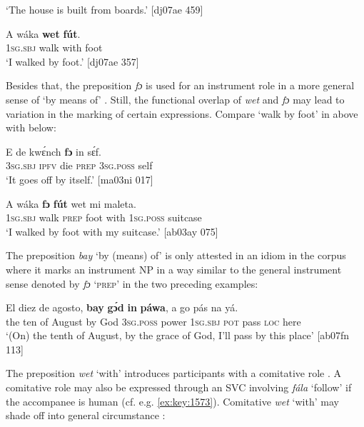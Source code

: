 \glt ‘The house is built from boards.’ [dj07ae 459]
\z


\ea%
    \label{ex:key:1067}
    \gll A    wáka  \textbf{wet}    \textbf{fút}.\\
\textsc{1sg.sbj}  walk  with    foot\\

\glt ‘I walked by foot.’ [dj07ae 357]
\z

Besides that, the preposition \textit{fɔ} is used for an instrument role in a more general sense of ‘by means of’ . Still, the functional overlap of \textit{wet} and \textit{fɔ} may lead to variation in the marking of certain expressions. Compare ‘walk by foot’ in  above with  below: 


\ea%
    \label{ex:key:1068}
    \gll E    de  kwɛ́nch  \textbf{fɔ}  in    sɛ́f.\\
\textsc{3sg.sbj}  \textsc{ipfv}  die    \textsc{prep}  \textsc{3sg.poss}  self\\

\glt ‘It goes off by itself.’ [ma03ni 017]
\z


\ea%
    \label{ex:key:1069}
    \gll A    wáka  \textbf{fɔ}  \textbf{fút}  wet    mi    maleta.\\
\textsc{1sg.sbj}  walk  \textsc{prep}  foot  with    \textsc{1sg.poss}  suitcase\\

\glt ‘I walked by foot with my suitcase.’ [ab03ay 075]
\z

The preposition \textit{bay} ‘by (means) of’ is only attested in an idiom in the corpus where it marks an instrument NP in a way similar to the general instrument sense denoted by \textit{fɔ} ‘\textsc{prep}’ in the two preceding examples:


\ea%
    \label{ex:key:1070}
    \gll El  diez  de  agosto,  \textbf{bay}  \textbf{gɔ́d}  \textbf{in}    \textbf{páwa},  a    go  pás  na  yá.\\
the  ten  of  August  by  God  \textsc{3sg.poss}  power  \textsc{1sg.sbj}  \textsc{pot}  pass  \textsc{loc}  here\\

\glt ‘(On) the tenth of August, by the grace of God, I’ll pass by this place’ [ab07fn 113]
\z

The preposition \textit{wet} ‘with’ introduces participants with a comitative role . A comitative role may also be expressed through an SVC involving \textit{fála} ‘follow’ if the accompanee is human (cf. e.g. \ref{ex:key:1573}). Comitative \textit{wet} ‘with’ may shade off into general circumstance : 


